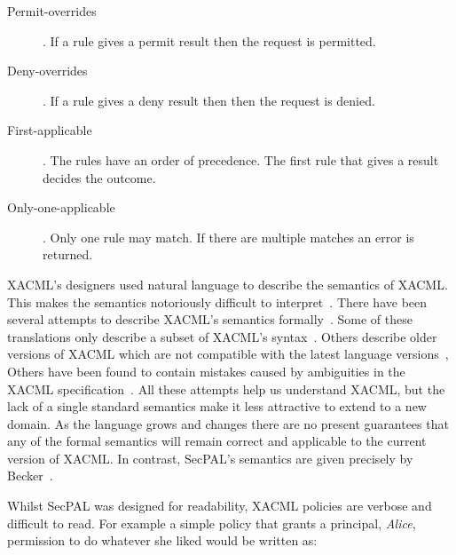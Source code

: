 \documentclass[thesis.tex]{subfiles}
\begin{document}
\begin{description}
  \item[Permit-overrides]. If a rule gives a permit result then the request is permitted.
  \item[Deny-overrides]. If a rule gives a deny result then then the request is denied.
  \item[First-applicable]. The rules have an order of precedence. The first rule that gives a result decides the outcome.
  \item[Only-one-applicable]. Only one rule may match. If there are multiple matches an error is returned.
\end{description}

XACML's designers used natural language to describe the semantics of XACML. This
makes the semantics notoriously difficult to
interpret~\cite{ramli_detecting_2015}. There have been several attempts to
describe XACML's semantics
formally~\cite{ramli_xacml_2012,ramli_logic_2014,bryans_reasoning_2005}. Some of
these translations only describe a subset of XACML's
syntax~\cite{halpern_using_2008}. Others describe older versions of XACML which
are not compatible with the latest language versions~\cite{ahn_reasoning_2010},
Others have been found to contain mistakes caused by ambiguities in the
XACML specification~\cite{bruns_access-control_2008,halpern_using_2008}. All
these attempts help us understand XACML, but the lack of a single standard
semantics make it less attractive to extend to a new domain. As the language
grows and changes there are no present guarantees that any of the formal
semantics will remain correct and applicable to the current version of XACML. In
contrast, SecPAL's semantics are given precisely by
Becker~\cite{becker_secpal:_2006}.

Whilst SecPAL was designed for readability, XACML policies are verbose and
difficult to read. For example a simple policy that grants a principal,
\emph{Alice}, permission to do whatever she liked would be written as:
\end{document}
